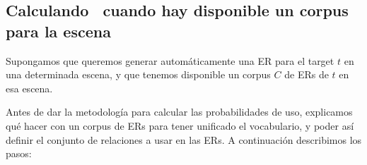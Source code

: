 
\subsection{Calculando \puse\ cuando hay disponible un corpus para la escena}
\label{sec:learning-corpus}

Supongamos que queremos generar autom\'aticamente una ER para el target $t$ en una
determinada escena, y que tenemos disponible un corpus $C$ de ERs de $t$
en esa escena.




Antes de dar la metodolog\'ia para calcular las probabilidades de uso, explicamos qu\'e hacer con un corpus de ERs para tener unificado el vocabulario, y poder as\'i definir el conjunto de relaciones a usar en las ERs. A continuaci\'on describimos los pasos:

